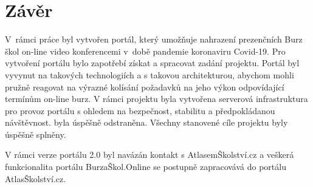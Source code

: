 \chapter*{Závěr}

V~rámci práce byl vytvořen portál, který umožňuje nahrazení prezenčních Burz škol on-line video konferencemi v~době pandemie koronaviru Covid-19.
Pro vytvoření portálu bylo zapotřebí získat a spracovat zadání projektu. 
Portál byl vyvynut na takových technologiích a s takovou architekturou, abychom mohli pružně reagovat na výrazné kolísání požadavků 
na jeho výkon odpovídající termínům on-line burz.
V rámci projektu byla vytvořena serverová infrastruktura pro provoz portálu s ohledem na bezpečnost, stabilitu a předpokládanou návštěvnost.
 byla úspěšně odstraněna.
Všechny stanovené cíle projektu byly úspěšně splněny.

V rámci verze portálu 2.0 byl navázán kontakt s AtlasemŠkolství.cz a veškerá funkcionalita portálu BurzaŠkol.Online se postupně zapracovává do portálu AtlasŠkolství.cz.



% 
% 
% 
% 

\pagebreak
